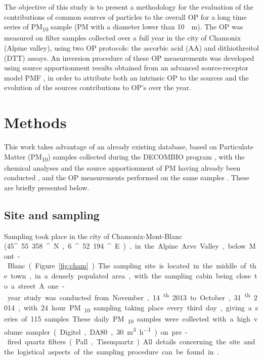 \documentclass[acp, manuscript]{copernicus}
\begin{document}
The objective of this study is to present a methodology for the evaluation of
the contributions of common sources of particles to the overall OP for a long
time series of PM\textsubscript{10} sample (PM with a diameter lower than
10~\unit{\mu m}). The OP was measured on filter samples collected
over a full year in the city of Chamonix (Alpine valley), using two OP
protocols: the ascorbic acid (AA) and dithiothreitol (DTT) assays. An inversion
procedure of these OP measurements was developed using source apportionment
results obtained from an advanced source-receptor model PMF
\citep{chevrier_chauffage_2016}, in order to attribute both an intrinsic OP to
the sources and the evolution of the sources contributions to OP's over
the year.


\section{Methods}

This work takes advantage of an already existing database, based on Particulate
Matter (PM\textsubscript{10}) samples collected during the DECOMBIO program
\citep{chevrier_decombio-contribution_2016}, with the chemical analyses and the
source apportionment of PM having already been conducted
\citep{chevrier_chauffage_2016}, and the OP measurements performed on the
same samples \citep{calas_comparison_2018}.  These are briefly presented below.

\subsection{Site and sampling}\label{site-and-sampling}

Sampling took place in the city of Chamonix-Mont-Blanc (45\unit{^\circ}55.358\unit{^\prime}~N,
6\unit{^\circ}52.194\unit{^\prime}~E), in the Alpine Arve Valley, below Mont-Blanc (Figure~\ref{fig:cham}). The sampling site is located in the
middle of the town, in a densely populated area, with the sampling cabin being
close to a street. A one-year study was conducted from November,
14\textsuperscript{th} 2013 to October, 31\textsuperscript{th} 2014, with 24
hour
PM\textsubscript{10} sampling taking place every third day, giving a series of
115 samples. These daily PM\textsubscript{10} samples were collected with a
high volume sampler (Digitel, DA80, 30~\unit{m^3~h^{-1}}) on pre-fired quartz
filters (Pall, Tissuquartz). All details
concerning the site and the logistical aspects of the sampling procedure can be
found in \citet{chevrier_chauffage_2016}.
\end{document}
